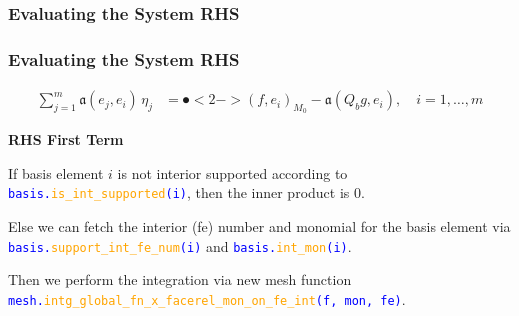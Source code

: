 \documentclass[compress]{beamer}
\begin{document}
\subsubsection{Evaluating the System RHS}

\begin{frame}
  \frametitle{Evaluating the System RHS}
  \vspace{-1.15cm}
  \begin{align*}
    \sum_{j=1}^m{\mathfrak{a}(e_j, e_i) \,\eta_j} &= \spot<2->{(f, e_i)_{M_0}} - \mathfrak{a}(Q_b g, e_i), \quad i=1,\dots,m
  \end{align*}
  
  \pause
  \uncover<+-> {
  \textbf{RHS First Term}
  \vspace{.3cm}

  \uncover<+-> {
  If basis element $i$ is not interior supported according to 
  {\small \texttt{\textcolor{blue}{basis.\textcolor{orange}{is\_int\_supported}(i)}}}, then the inner product is 0.\\
  
  \uncover<+-> {
  \vspace{.3cm}
  Else we can fetch the interior (fe) number and monomial for the basis element via
  {\small \texttt{\textcolor{blue}{basis.\textcolor{orange}{support\_int\_fe\_num}(i)}}}
  and {\small \texttt{\textcolor{blue}{basis.\textcolor{orange}{int\_mon}(i)}}}.
  
  \uncover<+-> {
  \vspace{.3cm}
  Then we perform the integration via new mesh function\\
  {\small \texttt{\textcolor{blue}{mesh.\textcolor{orange}{intg\_global\_fn\_x\_facerel\_mon\_on\_fe\_int}(f, mon, fe)}}}.
  }}}}
\end{frame}
\end{document}
